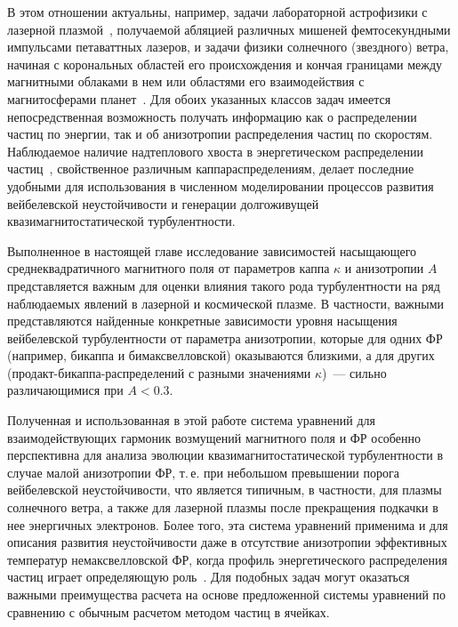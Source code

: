 В этом отношении актуальны, например, задачи лабораторной астрофизики с лазерной плазмой~\cite{Romanov2004, Thaury2010, Silva2020, Shukla2020, Zhang2020}, получаемой абляцией различных мишеней фемтосекундными импульсами петаваттных лазеров, и задачи физики солнечного (звездного) ветра, начиная с корональных областей его происхождения и кончая границами между магнитными облаками в нем или областями его взаимодействия с магнитосферами планет~\cite{Baumjohann2012, Dudik2017, Livadiotis2017,Marsch2006,Yoon2017,Echim2010}. 
Для обоих указанных классов задач имеется непосредственная возможность получать информацию как о распределении частиц по энергии, так и об анизотропии распределения частиц по скоростям. 
Наблюдаемое наличие надтеплового {\glqq}хвоста{\grqq} в энергетическом распределении частиц~\cite{Maksimovic2005, Vasyliunas1968,Lazar2022}, свойственное различным каппа{\PunctumKappa}распределениям, делает последние удобными для использования в численном моделировании процессов развития вейбелевской неустойчивости и генерации долгоживущей квазимагнитостатической турбулентности. 

Выполненное в настоящей главе исследование зависимостей насыщающего среднеквадратичного магнитного поля от параметров каппа $\kappa$ и анизотропии $A$ представляется важным для оценки влияния такого рода турбулентности на ряд наблюдаемых явлений в лазерной и космической плазме. 
В частности, важными представляются найденные конкретные зависимости уровня насыщения вейбелевской турбулентности от параметра анизотропии, которые для одних ФР (например, бикаппа{\PunctumKappa} и бимаксвелловской) оказываются близкими, а для других (продакт-бикаппа-распределений с разными значениями $\kappa$)~--- сильно различающимися при $A < 0.3$.

Полученная и использованная в этой работе система уравнений для взаимодействующих гармоник возмущений магнитного поля и ФР особенно перспективна для анализа эволюции квазимагнитостатической турбулентности в случае малой анизотропии ФР, т.\,е. при небольшом превышении порога вейбелевской неустойчивости, что является типичным, в частности, для плазмы солнечного ветра, а также для лазерной плазмы после прекращения подкачки в нее энергичных электронов. 
Более того, эта система уравнений применима и для описания развития неустойчивости даже в отсутствие анизотропии эффективных температур немаксвелловской ФР, когда профиль энергетического распределения частиц играет определяющую роль~\cite{Silva2021,Lazar2010}. 
Для подобных задач могут оказаться важными преимущества расчета на основе предложенной системы уравнений по сравнению с обычным расчетом методом частиц в ячейках.




